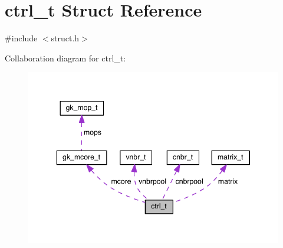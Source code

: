\hypertarget{structctrl__t}{}\section{ctrl\+\_\+t Struct Reference}
\label{structctrl__t}


{\ttfamily \#include $<$struct.\+h$>$}



Collaboration diagram for ctrl\+\_\+t\+:\nopagebreak
\begin{figure}[H]
\begin{center}
\leavevmode
\includegraphics[width=346pt]{structctrl__t__coll__graph}
\end{center}
\end{figure}
